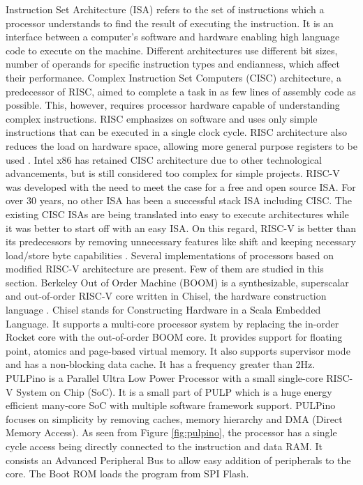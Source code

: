 Instruction Set Architecture (ISA) refers to the set of instructions which a processor understands to find the result of executing the instruction. It is an interface between a computer’s software and hardware enabling high language code to execute on the machine. Different architectures use different bit sizes, number of operands for specific instruction types and endianness, which affect their performance.\newline\newline
Complex Instruction Set Computers (CISC) architecture, a predecessor of RISC, aimed to complete a task in as few lines of assembly code as possible. This, however, requires processor hardware capable of understanding complex instructions. RISC emphasizes on software and uses only simple instructions that can be executed in a single clock cycle. RISC architecture also reduces the load on hardware space, allowing more general purpose registers to be used
\cite{risc_vs_cisc}. Intel x86 has retained CISC architecture due to other technological advancements, but is still considered too complex for simple projects.\newline \newline
RISC-V was developed with the need to meet the case for a free and open source ISA. For over 30 years, no other ISA has been a successful stack ISA including CISC. The existing CISC ISAs are being translated into easy to execute architectures while it was better to start off with an easy ISA. On this regard, RISC-V is better than its predecessors by removing unnecessary features like shift and keeping necessary load/store byte capabilities
\cite{riscv_isa_free}.\newline \newline
Several implementations of processors based on modified RISC-V architecture are present. Few of them are studied in this section. Berkeley Out of Order Machine (BOOM) is a synthesizable, superscalar and out-of-order RISC-V core written in Chisel, the hardware construction language
\cite{boom_2015}. Chisel stands for Constructing Hardware in a Scala Embedded Language. It supports a multi-core processor system by replacing the in-order Rocket core with the out-of-order BOOM core. It provides support for floating point, atomics and page-based virtual memory. It also supports supervisor mode and has a non-blocking data cache. It has a frequency greater than 2Hz.\newline \newline
PULPino is a Parallel Ultra Low Power Processor with a small single-core RISC-V System on Chip (SoC). It is a small part of PULP which is a huge energy efficient many-core SoC with multiple software framework support. PULPino focuses on simplicity by removing caches, memory hierarchy and DMA (Direct Memory Access). As seen from Figure \ref{fig:pulpino}, the processor has a single cycle access being directly connected to the instruction and data RAM. It consists an Advanced Peripheral Bus to allow easy addition of peripherals to the core. The Boot ROM loads the program from SPI Flash.\newline

